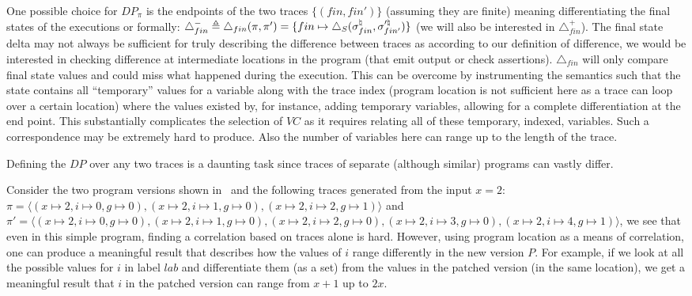 One possible choice for $DP_{\pi}$ is the endpoints of the two traces $\{(fin,fin')\}$ (assuming they are finite) meaning differentiating the final states of the executions or formally: $\triangle_{fin}^{-} \triangleq \triangle_{fin}(\pi,\pi') = \{fin\mapsto\triangle_{S}(\sigma^\natural_{fin},\sigma'^\natural_{fin'})\}$ (we will also be interested in $\triangle_{fin}^{+}$). The final state delta may not always be sufficient for truly describing the difference between traces as according to our definition of difference, we would be interested in checking difference at intermediate locations in the program (that emit output or check assertions). $\triangle_{fin}$ will only compare final state values and could miss what happened during the execution. This can be overcome by instrumenting the semantics such that the state contains all ``temporary'' values for a variable along with the trace index (program location is not sufficient here as a trace can loop over a certain location) where the values existed by, for instance, adding temporary variables, allowing for a complete differentiation at the end point. This substantially complicates the selection of $VC$ as it requires relating all of these temporary, indexed, variables. Such a correspondence may be extremely hard to produce. Also the number of variables here can range up to the length of the trace. 

Defining the $DP$ over any two traces is a daunting task since traces of separate (although similar) programs can vastly differ. 
\begin{Example}
Consider the two program versions shown in~ and the following traces generated from the input $x=2$: $\pi = \langle (x \mapsto 2,i \mapsto 0, g \mapsto 0),(x \mapsto 2,i \mapsto 1, g \mapsto 0),(x \mapsto 2,i \mapsto 2, g \mapsto 1) \rangle$ and $\pi' = \langle (x \mapsto 2,i \mapsto 0, g \mapsto 0),(x \mapsto 2,i \mapsto 1, g \mapsto 0),(x \mapsto 2,i \mapsto 2, g \mapsto 0),(x \mapsto 2,i \mapsto 3, g \mapsto 0),(x \mapsto 2,i \mapsto 4, g \mapsto 1)\rangle$, we see that even in this simple program, finding a correlation based on traces alone is hard.
However, using program location as a means of correlation, one can produce a meaningful result that describes how the values of $i$ range differently in the new version $P$. For example, if we look at all the possible values for $i$ in label $lab$ and differentiate them (as a set) from the values in the patched version (in the same location), we get a meaningful result that $i$ in the patched version can range from $x+1$ up to $2x$. 
\end{Example}


